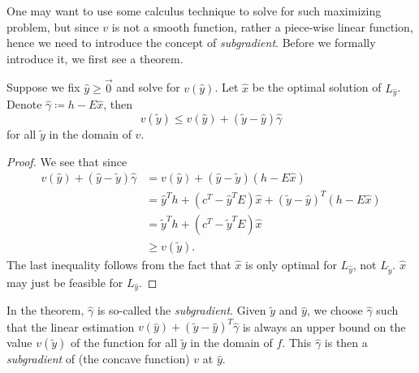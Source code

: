 \hr

One may want to use some calculus technique to solve for such maximizing problem, but since \(v\) is not a smooth function, rather a piece-wise linear
function, hence we need to introduce the concept of \emph{subgradient}. Before we formally introduce it, we first see a theorem.

\begin{theorem}
	Suppose we fix \(\hat{y}\geq \vec{0}\) and solve for \(v(\hat{y})\). Let \(\hat{x}\) be the optimal solution of \(L_{\hat{y}}\).
	Denote \(\hat{\gamma}\coloneqq h - E \hat{x}\), then
	\[
		v(\widetilde{y})\leq v(\hat{y})+(\widetilde{y} - \hat{y})\hat{\gamma}
	\]
	for all \(\widetilde{y}\) in the domain of \(v\).
\end{theorem}

\begin{figure}[H]
	\centering
	\label{fig:subgradient-theorem}
\end{figure}

\begin{figure}[H]
	\centering
	\label{fig:subgradient-theorem-2}
\end{figure}

\begin{proof}
	We see that since
	\[
		\begin{split}
			v(\hat{y})+(\hat{y} - \widetilde{y})\hat{\gamma}&=v(\hat{y})+(\hat{y} - \widetilde{y})(h - E \hat{x})\\
			&= \hat{y}^{T}h + (c^{T} - \hat{y}^{T}E)\hat{x} + (\widetilde{y} - \hat{y})^{T}(h - E \hat{x})\\
			&= \widetilde{y}^{T}h + (c^{T} - \widetilde{y}^{T} E)\hat{x}\\
			&\geq v(\widetilde{y}).
		\end{split}
	\]
	The last inequality follows from the fact that \(\hat{x}\) is only optimal for \(L_{\hat{y}}\), not \(L_{\widetilde{y}}\). \(\hat{x}\) may just be feasible for \(L_{\hat{y}}\).
\end{proof}

In the theorem, \(\hat{\gamma}\) is so-called the \emph{subgradient}. Given \(\widetilde{y}\) and \(\hat{y}\), we choose \(\hat{\gamma}\) such that
the linear estimation \(v(\hat{y})+(\widetilde{y} - \hat{y})^{T}\hat{\gamma}\) is always an upper bound on the value \(v(\widetilde{y})\) of the function
for all \(\widetilde{y}\) in the domain of \(f\). This \(\hat{\gamma}\) is then a \emph{subgradient} of (the concave function) \(v\) at \(\hat{y}\).


